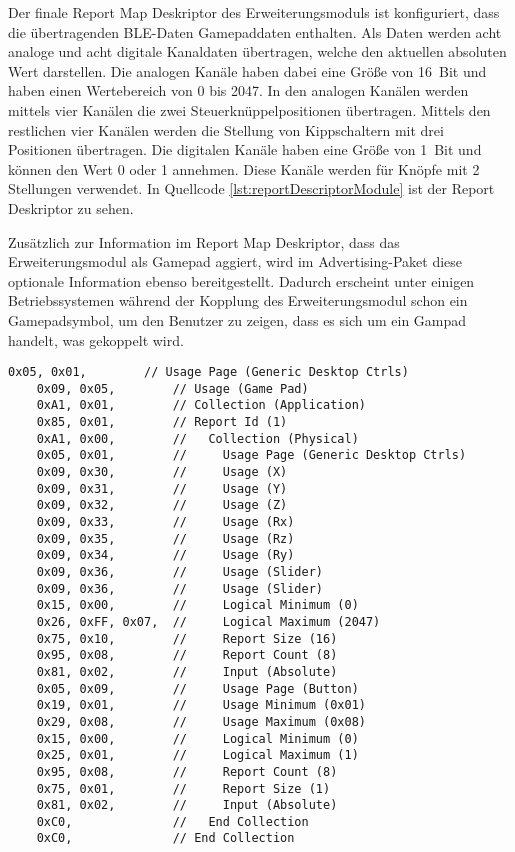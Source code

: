 Der finale Report Map Deskriptor des Erweiterungsmoduls ist konfiguriert, dass die übertragenden \ac{BLE}-Daten Gamepaddaten enthalten. Als Daten werden acht analoge und acht digitale Kanaldaten übertragen, welche den aktuellen absoluten Wert darstellen. Die analogen Kanäle haben dabei eine Größe von 16~Bit und haben einen Wertebereich von 0 bis 2047. In den analogen Kanälen werden mittels vier Kanälen die zwei Steuerknüppelpositionen übertragen. Mittels den restlichen vier Kanälen werden die Stellung von Kippschaltern mit drei Positionen übertragen. Die digitalen Kanäle haben eine Größe von 1~Bit und können den Wert 0 oder 1 annehmen. Diese Kanäle werden für Knöpfe mit 2 Stellungen verwendet. In Quellcode \ref{lst:reportDescriptorModule} ist der Report Deskriptor zu sehen.

Zusätzlich zur Information im Report Map Deskriptor, dass das Erweiterungsmodul als Gamepad aggiert, wird im Advertising-Paket diese optionale Information ebenso bereitgestellt. Dadurch erscheint unter einigen Betriebssystemen während der Kopplung des Erweiterungsmodul schon ein Gamepadsymbol, um den Benutzer zu zeigen, dass es sich um ein Gampad handelt, was gekoppelt wird.

\begin{lstlisting}[caption=Report Map Deskriptor des Erweiterungsmoduls, label={lst:reportDescriptorModule}, style=generalStyle]
    0x05, 0x01,        // Usage Page (Generic Desktop Ctrls)
    0x09, 0x05,        // Usage (Game Pad)
    0xA1, 0x01,        // Collection (Application)
    0x85, 0x01,        // Report Id (1)
    0xA1, 0x00,        //   Collection (Physical)
    0x05, 0x01,        //     Usage Page (Generic Desktop Ctrls)
    0x09, 0x30,        //     Usage (X)
    0x09, 0x31,        //     Usage (Y)
    0x09, 0x32,        //     Usage (Z)
    0x09, 0x33,        //     Usage (Rx)
    0x09, 0x35,        //     Usage (Rz)
    0x09, 0x34,        //     Usage (Ry)
    0x09, 0x36,        //     Usage (Slider)
    0x09, 0x36,        //     Usage (Slider)
    0x15, 0x00,        //     Logical Minimum (0)
    0x26, 0xFF, 0x07,  //     Logical Maximum (2047)
    0x75, 0x10,        //     Report Size (16)
    0x95, 0x08,        //     Report Count (8)
    0x81, 0x02,        //     Input (Absolute)
    0x05, 0x09,        //     Usage Page (Button)
    0x19, 0x01,        //     Usage Minimum (0x01)
    0x29, 0x08,        //     Usage Maximum (0x08)
    0x15, 0x00,        //     Logical Minimum (0)
    0x25, 0x01,        //     Logical Maximum (1)
    0x95, 0x08,        //     Report Count (8)
    0x75, 0x01,        //     Report Size (1)
    0x81, 0x02,        //     Input (Absolute)
    0xC0,              //   End Collection
    0xC0,              // End Collection
\end{lstlisting}

